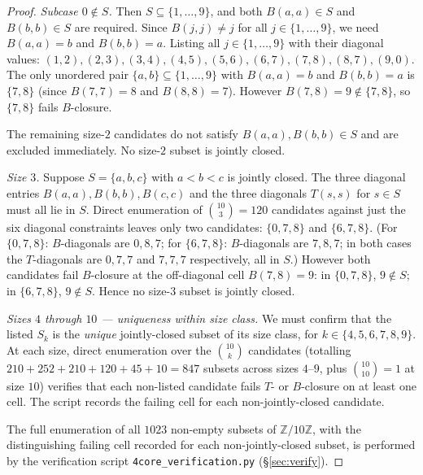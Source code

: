 \documentclass[11pt,reqno]{amsart}
\theoremstyle{plain}
\theoremstyle{definition}
\theoremstyle{remark}
\newcommand{\Z}{\mathbb{Z}}
\newcommand{\Zten}{\Z/10\Z}
\begin{document}
\begin{proof}
\emph{Subcase $0\notin S$.} Then $S\subseteq\{1,\dots,9\}$, and
both $B(a,a)\in S$ and $B(b,b)\in S$ are required. Since
$B(j,j)\neq j$ for all $j\in\{1,\dots,9\}$, we need $B(a,a)=b$ and
$B(b,b)=a$. Listing all $j\in\{1,\dots,9\}$ with their diagonal
values: $(1,2),(2,3),(3,4),(4,5),(5,6),(6,7),(7,8),(8,7),(9,0)$.
The only unordered pair $\{a,b\}\subseteq\{1,\dots,9\}$ with
$B(a,a)=b$ and $B(b,b)=a$ is $\{7,8\}$ (since $B(7,7)=8$ and
$B(8,8)=7$). However $B(7,8)=9\notin\{7,8\}$, so $\{7,8\}$ fails
$B$-closure.

The remaining size-$2$ candidates do not satisfy
$B(a,a),B(b,b)\in S$ and are excluded immediately. No size-$2$
subset is jointly closed.

\emph{Size $3$.} Suppose $S=\{a,b,c\}$ with $a<b<c$ is jointly
closed. The three diagonal entries $B(a,a),B(b,b),B(c,c)$ and the
three diagonals $T(s,s)$ for $s\in S$ must all lie in $S$. Direct
enumeration of $\binom{10}{3}=120$ candidates against just the
six diagonal constraints leaves only two candidates:
$\{0,7,8\}$ and $\{6,7,8\}$. (For $\{0,7,8\}$: $B$-diagonals are
$0,8,7$; for $\{6,7,8\}$: $B$-diagonals are $7,8,7$; in both
cases the $T$-diagonals are $0,7,7$ and $7,7,7$ respectively,
all in $S$.) However both candidates fail $B$-closure at the
off-diagonal cell $B(7,8)=9$: in $\{0,7,8\}$, $9\notin S$; in
$\{6,7,8\}$, $9\notin S$. Hence no size-$3$ subset is jointly
closed.

\emph{Sizes $4$ through $10$ — uniqueness within size class.} We
must confirm that the listed $S_{k}$ is the \emph{unique}
jointly-closed subset of its size class, for $k\in\{4,5,6,7,8,9\}$.
At each size, direct enumeration over the $\binom{10}{k}$
candidates (totalling $210+252+210+120+45+10=847$ subsets across
sizes $4$–$9$, plus $\binom{10}{10}=1$ at size $10$) verifies that
each non-listed candidate fails $T$- or $B$-closure on at least
one cell. The script records the failing cell for each
non-jointly-closed candidate.

The full enumeration of all $1023$ non-empty subsets of $\Zten$,
with the distinguishing failing cell recorded for each
non-jointly-closed subset, is performed by the verification
script \texttt{4core\_verification.py} (\S\ref{sec:verify}).
\end{proof}
\end{document}
